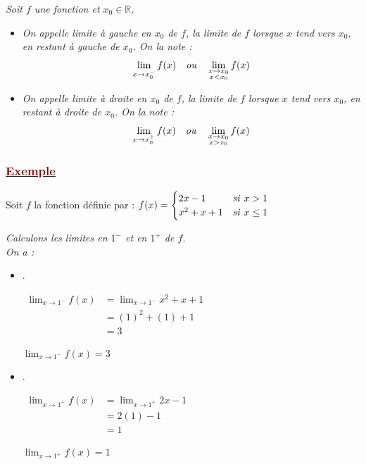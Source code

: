 \documentclass[12pt,a4paper]{article}
\begin{document}
\textit{Soit $f$ une fonction et $x_0 \in \mathbb{R}$.}

\begin{itemize}
\item \textit{On appelle limite à gauche en $x_0$ de $f$, la limite de $f$ lorsque $x$ tend vers $x_0$, en restant à gauche de $x_0$. On la note :}
\[
\lim_{x \to x_0^-} f(x) \quad \text{\textit{ou}} \quad \lim_{\substack{x \to x_0 \\ x < x_0}} f(x)
\]

\vspace{0.3cm}
\item \textit{On appelle limite à droite en $x_0$ de $f$, la limite de $f$ lorsque $x$ tend vers $x_0$, en restant à droite de $x_0$. On la note :}
\[
\lim_{x \to x_0^+} f(x) \quad \text{\textit{ou}} \quad \lim_{\substack{x \to x_0 \\ x > x_0}} f(x)
\]

\end{itemize}

\subsubsection*{\underline{\textcolor{darkred}{ Exemple }}}

Soit $f$ la fonction définie par : 
$
f(x) =
\begin{cases} 
2x - 1 & \text{\textit{si }} x > 1 \\ 
x^2 + x + 1 & \text{\textit{si }} x \leq 1 
\end{cases}
$

\vspace{0.3cm}

\noindent \textit{Calculons les limites en $1^-$ et en $1^+$ de $f$.} \\
\textit{On a :}

\begin{itemize}
    \item .
    
    $
    \begin{aligned}
    \displaystyle \lim_{x \to 1^-} f(x) &= \lim_{x \to 1^-} x^2 + x + 1 \\
    &= (1)^2 + (1) + 1 \\
    &= 3
    \end{aligned}
    $
    
    $\boxed{\lim_{x \to 1^-} f(x) = 3}$
    
    \vspace{0.3cm}
    \item .
    
     $
    \begin{aligned}
    \displaystyle \lim_{x \to 1^+} f(x) &= \lim_{x \to 1^+} 2x - 1 \\
    &= 2(1) - 1 \\
    &= 1
    \end{aligned}
    $
    
    $ \boxed{\lim_{x \to 1^+} f(x) = 1}$
\end{itemize}
\end{document}
